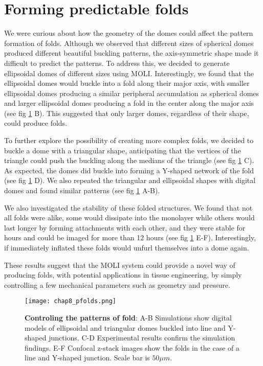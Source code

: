 \hypertarget{forming-predictable-folds}{%
	\section{Forming predictable folds}\label{forming-predictable-folds}}

We were curious about how the geometry of the domes could affect the pattern formation of folds. Although we observed that different sizes of spherical domes produced different beautiful buckling patterns, the axis-symmetric shape made it difficult to predict the patterns. To address this, we decided to generate ellipsoidal domes of different sizes using MOLI. Interestingly, we found that the ellipsoidal domes would buckle into a fold along their major axis, with smaller ellipsoidal domes producing a similar peripheral accumulation as spherical domes and larger ellipsoidal domes producing a fold in the center along the major axis (see fig \ref{fig_8_7} B). This suggested that only larger domes, regardless of their shape, could produce folds.

To further explore the possibility of creating more complex folds, we decided to buckle a dome with a triangular shape, anticipating that the vertices of the triangle could push the buckling along the medians of the triangle (see fig \ref{fig_8_7} C). As expected, the domes did buckle into forming a Y-shaped network of the fold (see fig \ref{fig_8_7} D). We also repeated the triangular and ellipsoidal shapes with digital domes and found similar patterns (see fig \ref{fig_8_7} A-B).

We also investigated the stability of these folded structures. We found that not all folds were alike, some would dissipate into the monolayer while others would last longer by forming attachments with each other, and they were stable for hours and could be imaged for more than 12 hours (see fig \ref{fig_8_7} E-F). Interestingly, if immediately inflated these folds would unfurl themselves into a dome again.

These results suggest that the MOLI system could provide a novel way of producing folds, with potential applications in tissue engineering, by simply controlling a few mechanical parameters such as geometry and pressure.

\begin{figure}
	\centering
	\texttt{[image: chap8\_pfolds.png]}
	\caption{\label{fig_8_7} \textbf{Controling the patterns of fold}: A-B Simulations show digital models of ellipsoidal and triangular domes buckled into line and Y-shaped junctions. C-D Experimental results confirm the simulation findings. E-F Confocal z-stack images show the folds in the case of a line and Y-shaped junction. Scale bar is $50\mu m$.	}
\end{figure}


